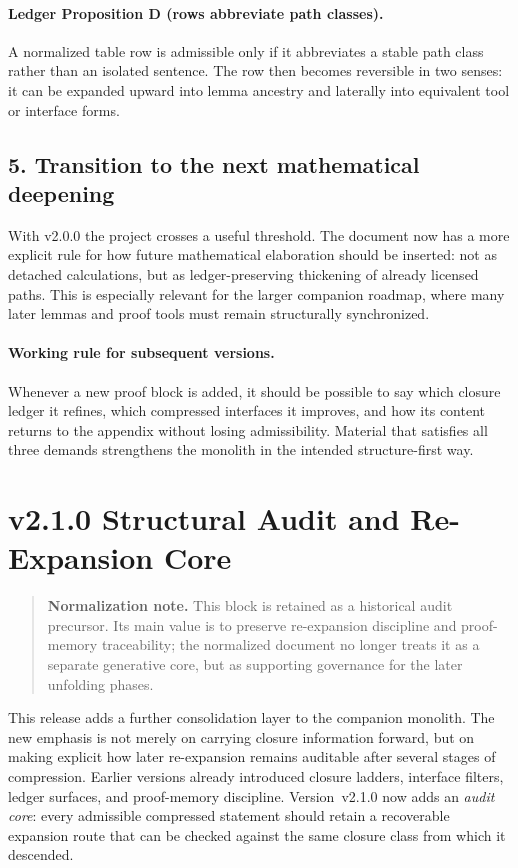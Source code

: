 \paragraph{Ledger Proposition D (rows abbreviate path classes).}
A normalized table row is admissible only if it abbreviates a stable path class
rather than an isolated sentence. The row then becomes reversible in two senses:
it can be expanded upward into lemma ancestry and laterally into equivalent tool
or interface forms.

\subsection*{5. Transition to the next mathematical deepening}
With v2.0.0 the project crosses a useful threshold. The document now has a
more explicit rule for how future mathematical elaboration should be inserted:
not as detached calculations, but as ledger-preserving thickening of already
licensed paths. This is especially relevant for the larger companion roadmap,
where many later lemmas and proof tools must remain structurally synchronized.

\paragraph{Working rule for subsequent versions.}
Whenever a new proof block is added, it should be possible to say which closure
ledger it refines, which compressed interfaces it improves, and how its content
returns to the appendix without losing admissibility. Material that satisfies
all three demands strengthens the monolith in the intended structure-first way.


\clearpage
\section*{v2.1.0 Structural Audit and Re-Expansion Core}
\begin{quote}
\textbf{Normalization note.} This block is retained as a historical audit precursor. Its main value is to preserve re-expansion discipline and proof-memory traceability; the normalized document no longer treats it as a separate generative core, but as supporting governance for the later unfolding phases.
\end{quote}

This release adds a further consolidation layer to the companion monolith. The
new emphasis is not merely on carrying closure information forward, but on
making explicit how later re-expansion remains auditable after several stages of
compression. Earlier versions already introduced closure ladders, interface
filters, ledger surfaces, and proof-memory discipline. Version~v2.1.0 now
adds an \emph{audit core}: every admissible compressed statement should retain a
recoverable expansion route that can be checked against the same closure class
from which it descended.

